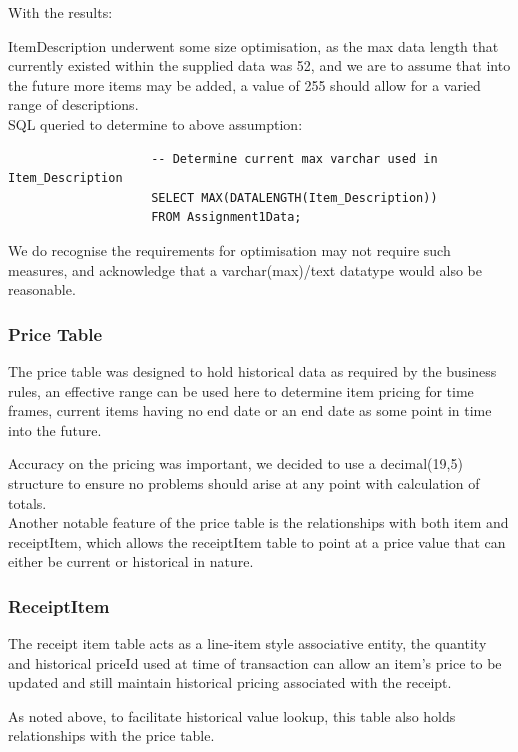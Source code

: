 \documentclass{article}
\begin{document}
                With the results:

                ItemDescription underwent some size optimisation, as the max data length 
                that currently existed within the supplied data was 52, and we are to assume
                that into the future more items may be added, a value of 255 should allow
                for a varied range of descriptions.
                \\
                SQL queried to determine to above assumption:

                \begin{lstlisting}
                    -- Determine current max varchar used in Item_Description
                    SELECT MAX(DATALENGTH(Item_Description)) 
                    FROM Assignment1Data;
                \end{lstlisting}

                We do recognise the requirements for optimisation may not require such measures, and 
                acknowledge that a varchar(max)/text datatype would also be reasonable.
            \subsubsection{Price Table}
                The price table was designed to hold historical data as required by the business rules,
                an effective range can be used here to determine item pricing for time frames,
                current items having no end date or an end date as some point in time into the future.
                \par
                Accuracy on the pricing was important, we decided to use a decimal(19,5) structure to
                ensure no problems should arise at any point with calculation of totals.\cite{MoneyIssues}
                \\
                Another notable feature of the price table is the relationships with both
                item and receiptItem, which allows the receiptItem table to point at a price value 
                that can either be current or historical in nature.
            \subsubsection{ReceiptItem}
                The receipt item table acts as a line-item style associative entity, the quantity and 
                historical priceId used at time of transaction can allow an item's price to be
                updated and still maintain historical pricing associated with the receipt.
                \par
                As noted above, to facilitate historical value lookup, this table also holds relationships
                with the price table.
\end{document}
